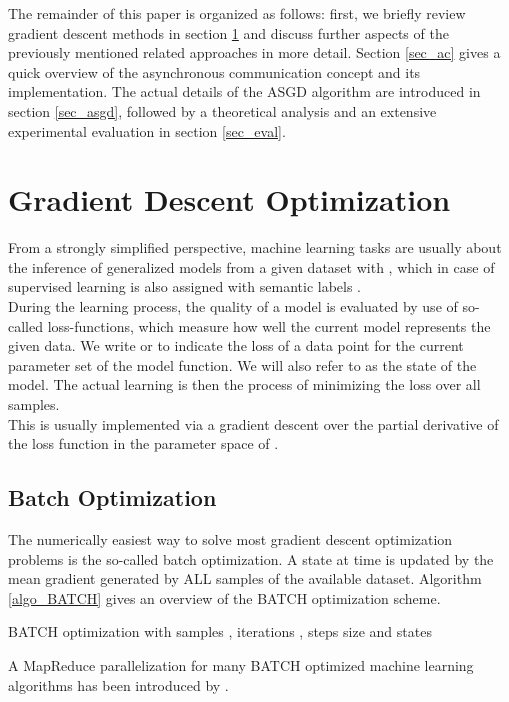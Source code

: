 \documentclass{acm_proc_article-sp}
\begin{document}
The remainder of this paper is organized as follows: first, we briefly review 
gradient descent methods in section \ref{sec_gd} and discuss further
aspects of the 
previously mentioned related approaches in more detail. Section \ref{sec_ac}
gives a quick overview of the asynchronous communication concept and its 
implementation. The actual details of the ASGD algorithm are introduced 
in section \ref{sec_asgd},
followed by a theoretical analysis and an extensive experimental evaluation in 
section \ref{sec_eval}.      

\section{Gradient Descent Optimization}\label{sec_gd}
From a strongly simplified perspective, machine learning tasks are usually about the 
inference of generalized models from a given dataset  with , 
which in case of supervised learning is also assigned with semantic labels 
.\\
During the learning process, the quality of a model is
evaluated by use of so-called loss-functions, which measure how well the current model 
represents the given data. We write  or  to indicate the 
loss of a data point for the current parameter set  of the model function.
We will also refer to  as the state of the model. The actual learning
is then the process of minimizing the loss over all samples.\\
This is usually implemented via a gradient descent over the partial derivative of
the loss function in the parameter space of .   

\subsection{Batch Optimization}
The numerically easiest way to solve most gradient descent optimization
problems is the so-called batch optimization. A state  at time 
is updated by the mean gradient generated by ALL samples of the available
dataset. Algorithm \ref{algo_BATCH} gives an overview of the BATCH optimization
scheme.  
\begin{algorithm}
\caption{BATCH optimization with
samples ,
iterations , steps size
 and
states }
\label{algo_BATCH}
\begin{algorithmic}[1]
\ForAll{ }
\State{}
\EndFor
\end{algorithmic}
\end{algorithm}
A MapReduce parallelization for many BATCH optimized machine learning 
algorithms has been introduced by \cite{chu2007map}.
\end{document}
